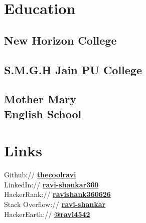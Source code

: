 \documentclass[]{deedy-resume-openfont}
\begin{document}
%
%

%
%

%
%

\begin{minipage}[t]{0.33\textwidth} 


\section{Education} 

\subsection{New Horizon College}
\sectionsep

\subsection{S.M.G.H Jain PU College}
\sectionsep

\subsection{Mother Mary \\English School}


\section{Links} 
Github:// \href{https://github.com/thecoolravi}{\bf thecoolravi} \\
LinkedIn://  \href{https://www.linkedin.com/in/ravi-shankar360/}{\bf ravi-shankar360} \\
HackerRank://  \href{https://www.hackerrank.com/ravishank360626?hr_r=1}{\bf ravishank360626} \\
Stack Overflow://  \href{https://stackoverflow.com/users/22228487/ravi-shankar}{\bf ravi-shankar} \\
HackerEarth://  \href{https://www.hackerearth.com/@ravi4542}{\bf @ravi4542}


\end{minipage}
\end{document}

